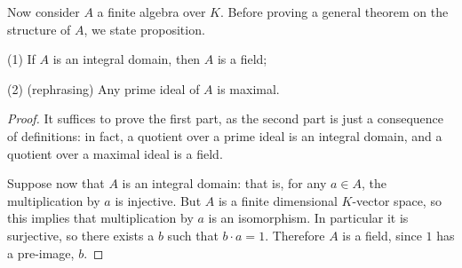 Now consider $A$ a finite algebra over $K$. Before proving a general theorem on the structure of $A$, we state proposition.

\begin{prop}
(1) If $A$ is an integral domain, then $A$ is a field;

(2) (rephrasing) Any prime ideal of $A$ is maximal.
\end{prop}
\begin{proof}
It suffices to prove the first part, as the second part is just a consequence of definitions: in fact, a quotient over a prime ideal is an integral domain, and a quotient over a maximal ideal is a field.

Suppose now that $A$ is an integral domain: that is, for any $a \in A$, the multiplication by $a$ is injective.
But $A$ is a finite dimensional $K$-vector space, so this implies that multiplication by $a$ is an isomorphism.
In particular it is surjective, so there exists a $b$ such that $b \cdot a = 1$.
Therefore $A$ is a field, since $1$ has a pre-image, $b$.
\end{proof}

